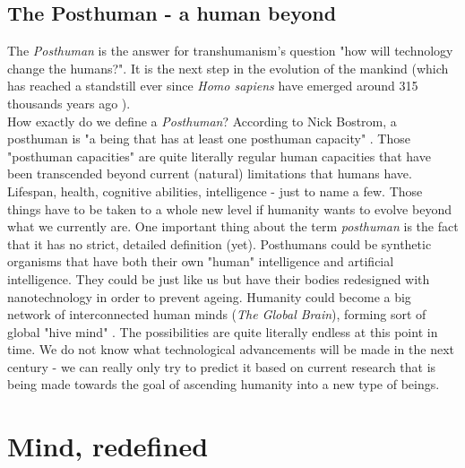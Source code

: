 \documentclass[12pt]{article}
\begin{document}
\subsection{The Posthuman - a human beyond}
	The \emph{Posthuman} is the answer for transhumanism's question "how will technology change the humans?". It is the next step in the evolution of the mankind (which has reached a standstill ever since \emph{Homo sapiens} have emerged around 315 thousands years ago \cite{homosapiens:1}). 
	\\How exactly do we define a \emph{Posthuman}? According to Nick Bostrom, a posthuman is "a being that has at least one posthuman capacity" \cite{posthuman:1}. Those "posthuman capacities" are quite literally regular human capacities that have been transcended beyond current (natural) limitations that humans have. Lifespan, health, cognitive abilities, intelligence - just to name a few. Those things have to be taken to a whole new level if humanity wants to evolve beyond what we currently are. One important thing about the term \emph{posthuman} is the fact that it has no strict, detailed definition (yet). Posthumans could be synthetic organisms that have both their own "human" intelligence and artificial intelligence. They could be just like us but have their bodies redesigned with nanotechnology in order to prevent ageing. Humanity could become a big network of interconnected human minds (\emph{The Global Brain}), forming sort of global "hive mind" \cite{transhumanistFAQ:2}. The possibilities are quite literally endless at this point in time. We do not know what technological advancements will be made in the next century - we can really only try to predict it based on current research that is being made towards the goal of ascending humanity into a new type of beings.
\section{Mind, redefined}
\end{document}
